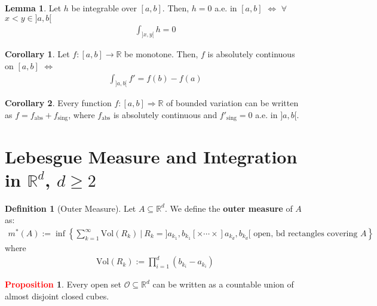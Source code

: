 \documentclass[11pt]{article}
\theoremstyle{definition}
\newcommand{\rd}[0]{\mathbb{R}^d}
\newcommand{\bb}[1]{\mathbb{#1}}
\newcommand{\sets}[2]{ \left\{ #1\ |\ #2 \right\}}
\newtheorem{corollary}{Corollary}
\newtheorem{lemma}[theorem]{Lemma}
\theoremstyle{definition}
\newtheorem{definition}{\textcolor{OliveGreen}{Definition}}
\newtheorem{prop}{\textcolor{red}{Proposition}}
\theoremstyle{remark}
\begin{document}
\begin{lemma}
	Let $h$ be integrable over $[a,b]$. Then, $h=0$ a.e. in $[a,b]$ $\iff$ $\forall$ $x < y \in ]a,b[$
	\begin{align*}
		\int_{]x,y[} h = 0 	
	\end{align*}
\end{lemma}

\begin{corollary}
	Let $f: [a,b] \rightarrow \bb{R}$ be monotone. Then, $f$ is absolutely continuous on $[a,b]$ $\iff$ 
\begin{align*}
	\int_{]a,b[} f' = f(b) - f(a) 	
\end{align*}
\end{corollary}

\begin{corollary}
	Every function $f : [a,b] \Rightarrow \bb{R}$ of bounded variation can be written as $f = f_{\mbox{abs}} + f_{\mbox{sing}}$, where $f_{\mbox{abs}}$ is absolutely continuous and $ f'_{\mbox{sing}} = 0$ a.e. in $]a, b[$. 
\end{corollary}

\section{Lebesgue Measure and Integration in $\bb{R}^d$, $d \geq 2$}

\begin{definition}[Outer Measure]
	Let $A \subseteq \rd$. We define the \textbf{outer measure} of $A$ as: 
	\begin{align}
		m^*(A) := \inf \sets{\sum_{k=1}^\infty \mbox{Vol}(R_k)}{R_k = ]a_{k_1}, b_{k_1}[ \times \cdots \times ]a_{k_d}, b_{k_d} [ \mbox{ open, bd rectangles covering } A}
	\end{align}
	where 
	\begin{align*}
		\mbox{Vol}(R_k) := \prod_{i=1}^d (b_{k_i} - a_{k_i} ) 	
	\end{align*}
\end{definition}

\begin{prop}
	Every open set $\mathcal{O} \subseteq \rd$ can be written as a countable union of almost disjoint closed cubes. 
\end{prop}
\end{document}

